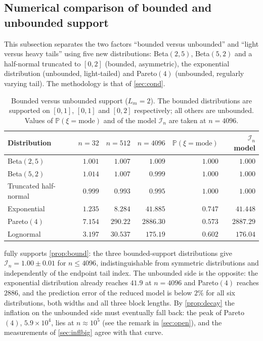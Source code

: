 \documentclass[review,hidelinks,oneeqnum,onetabnum,onefignum,onethmnum]{siamart251216}
\begin{document}
\subsection{Numerical comparison of bounded and unbounded support}
\label{sec:domains-res}

This subsection separates the two factors ``bounded versus unbounded'' and
``light versus heavy tails'' using five new distributions: Beta$(2,5)$,
Beta$(5,2)$ and a half-normal truncated to $[0,2]$ (bounded, asymmetric), the
exponential distribution (unbounded, light-tailed) and Pareto$(4)$ (unbounded,
regularly varying tail). The methodology is that of \cref{sec:cond}.

\begin{table}[!tb]
\centering
\caption{Bounded versus unbounded support ($L_m=2$). The bounded
distributions are supported on $[0,1]$, $[0,1]$ and $[0,2]$ respectively; all
others are unbounded. Values of $\mathbb{P}(\xi=\text{mode})$ and of the model
$\mathcal I_n$ are taken at $n=4096$.}
\label{tab:bounded}
\footnotesize
\setlength{\tabcolsep}{4pt}
\begin{tabular}{@{}lrrrrr@{}}
\toprule
Distribution & $n=32$ & $n=512$ & $n=4096$ & $\mathbb{P}(\xi{=}\text{mode})$ & $\mathcal I_n$ model \\
\midrule
Beta$(2,5)$      & $1.001$ & $1.007$ & $1.009$ & $1.000$ & $1.000$ \\
Beta$(5,2)$      & $1.014$ & $1.007$ & $0.999$ & $1.000$ & $1.000$ \\
Truncated half-normal & $0.999$ & $0.993$ & $0.995$ & $1.000$ & $1.000$ \\
\midrule
Exponential      & $1.235$ & $8.284$ & $41.885$ & $0.747$ & $41.448$ \\
Pareto$(4)$      & $7.154$ & $290.22$ & $2886.30$ & $0.573$ & $2887.29$ \\
Lognormal        & $3.197$ & $30.537$ & $175.19$ & $0.602$ & $176.04$ \\
\bottomrule
\end{tabular}
\end{table}

 fully supports \cref{prop:bound}: the three bounded-support
distributions give $\mathcal I_n=1.00\pm0.01$ for $n\le4096$, indistinguishable
from symmetric distributions and independently of the endpoint tail index. The
unbounded side is the opposite: the exponential distribution already reaches
$41.9$ at $n=4096$ and Pareto$(4)$ reaches $2886$, and the prediction error of the
reduced model is below $2\%$ for all six distributions, both widths and all three
block lengths. By \cref{prop:decay} the inflation on the unbounded side must
eventually fall back: the peak of Pareto$(4)$, $5.9\times10^4$, lies at
$n\approx10^5$ (see the remark in \cref{sec:open}), and the measurements of
\cref{sec:inflbig} agree with that curve.
\end{document}
